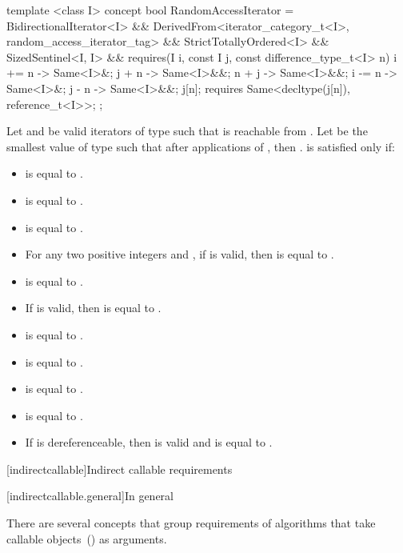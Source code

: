 %
\begin{codeblock}
  template <class I>
  concept bool RandomAccessIterator =
    BidirectionalIterator<I> &&
    DerivedFrom<iterator_category_t<I>, random_access_iterator_tag> &&
    StrictTotallyOrdered<I> &&
    SizedSentinel<I, I> &&
    requires(I i, const I j, const difference_type_t<I> n) {
      { i += n } -> Same<I>&;
      { j + n }  -> Same<I>&&;
      { n + j }  -> Same<I>&&;
      { i -= n } -> Same<I>&;
      { j - n }  -> Same<I>&&;
      j[n];
      requires Same<decltype(j[n]), reference_t<I>>;
    };
\end{codeblock}

\pnum
Let  and  be valid iterators of type  such that  is reachable
from . Let  be the smallest value of type
 such that after
 applications of , then .
 is satisfied only if:

\begin{itemize}
\item {} is equal to .
\item {} is equal to .
\item {} is equal to .
\item For any two positive integers  and , if  is valid, then
 is equal to .
\item {} is equal to .
\item If  is valid, then  is equal to .
\item {} is equal to .
\item {} is equal to .
\item {} is equal to .
\item {} is equal to .
\item If  is dereferenceable, then  is valid and is equal to .
\end{itemize}

[indirectcallable]{Indirect callable requirements}

[indirectcallable.general]{In general}

\pnum
There are several concepts that group requirements of algorithms that take callable
objects~() as arguments.

